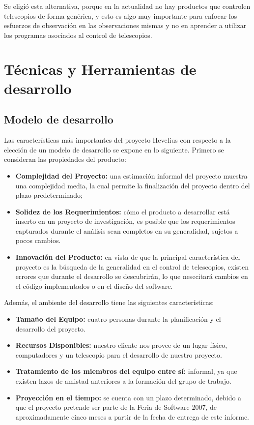 \documentclass[letterpaper,spanish,10pt]{article}
\begin{document}
Se eligi\'o esta alternativa, porque en la actualidad no hay productos que controlen
telescopios de forma gen\'erica, y esto es algo muy importante para enfocar los esfuerzos
de observaci\'on en las observaciones mismas y no en aprender a utilizar los programas
asociados al control de telescopios.


\newpage
\section{T\'ecnicas y Herramientas de desarrollo} %
\subsection{Modelo de desarrollo}
Las caracter\'isticas m\'as importantes del proyecto Hevelius con
respecto a la elecci\'on de un modelo de desarrollo se expone en lo
siguiente. Primero se consideran las propiedades del producto:

\begin{itemize}
\item \textbf{Complejidad del Proyecto:} una estimaci\'on informal del proyecto
  muestra una complejidad media, la cual permite la finalizaci\'on del
  proyecto dentro del plazo predeterminado;
\item \textbf{Solidez de los Requerimientos:} c\'omo el producto a
  desarrollar est\'a inserto en un proyecto de investigaci\'on, es posible que
  los requerimientos capturados durante el an\'alisis sean completos en su generalidad,
  sujetos a pocos cambios.
\item \textbf{Innovaci\'on del Producto:} en vista de que la principal caracter\'istica
  del proyecto es la b\'usqueda de la generalidad en el control de telescopios, existen 
  errores que durante el desarrollo se descubrir\'an, lo que nesecitar\'a cambios en el
  c\'odigo implementados o en el dise\~no del software.
\end{itemize}

Adem\'as, el ambiente del desarrollo tiene las siguientes caracter\'isticas:

\begin{itemize}
\item \textbf{Tama\~no del Equipo:} cuatro personas durante la planificaci\'on y el 
  desarrollo del proyecto.
\item \textbf{Recursos Disponibles:} nuestro cliente nos provee de un lugar f\'isico, 
  computadores y un telescopio para el desarrollo de nuestro proyecto.
\item \textbf{Tratamiento de los miembros del equipo entre s\'i:} informal, ya
  que existen lazos de amistad anteriores a la formaci\'on del grupo de trabajo.
\item \textbf{Proyecci\'on en el tiempo:} se cuenta con un plazo determinado,
  debido a que el proyecto pretende ser parte de la Feria de Software 2007, 
  de aproximadamente cinco meses a partir de la fecha de entrega de este informe.
\end{itemize}
\end{document}

